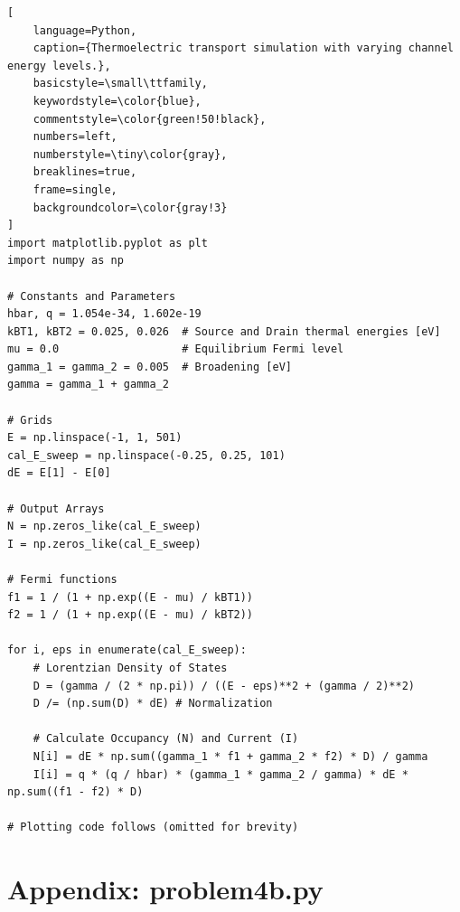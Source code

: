 \documentclass[a4paper, 10pt]{article}
\begin{document}
\begin{lstlisting}[
    language=Python,
    caption={Thermoelectric transport simulation with varying channel energy levels.},
    basicstyle=\small\ttfamily,
    keywordstyle=\color{blue},
    commentstyle=\color{green!50!black},
    numbers=left,
    numberstyle=\tiny\color{gray},
    breaklines=true,
    frame=single,
    backgroundcolor=\color{gray!3}
]
import matplotlib.pyplot as plt
import numpy as np

# Constants and Parameters
hbar, q = 1.054e-34, 1.602e-19
kBT1, kBT2 = 0.025, 0.026  # Source and Drain thermal energies [eV]
mu = 0.0                   # Equilibrium Fermi level
gamma_1 = gamma_2 = 0.005  # Broadening [eV]
gamma = gamma_1 + gamma_2

# Grids
E = np.linspace(-1, 1, 501)
cal_E_sweep = np.linspace(-0.25, 0.25, 101)
dE = E[1] - E[0]

# Output Arrays
N = np.zeros_like(cal_E_sweep)
I = np.zeros_like(cal_E_sweep)

# Fermi functions
f1 = 1 / (1 + np.exp((E - mu) / kBT1))
f2 = 1 / (1 + np.exp((E - mu) / kBT2))

for i, eps in enumerate(cal_E_sweep):
    # Lorentzian Density of States
    D = (gamma / (2 * np.pi)) / ((E - eps)**2 + (gamma / 2)**2)
    D /= (np.sum(D) * dE) # Normalization

    # Calculate Occupancy (N) and Current (I)
    N[i] = dE * np.sum((gamma_1 * f1 + gamma_2 * f2) * D) / gamma
    I[i] = q * (q / hbar) * (gamma_1 * gamma_2 / gamma) * dE * np.sum((f1 - f2) * D)

# Plotting code follows (omitted for brevity)
\end{lstlisting}

\section*{Appendix: problem4b.py}
\label{appendix:calc_4b}
\end{document}
